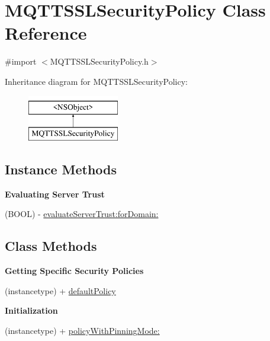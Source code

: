 \hypertarget{interface_m_q_t_t_s_s_l_security_policy}{}\section{M\+Q\+T\+T\+S\+S\+L\+Security\+Policy Class Reference}
\label{interface_m_q_t_t_s_s_l_security_policy}


{\ttfamily \#import $<$M\+Q\+T\+T\+S\+S\+L\+Security\+Policy.\+h$>$}

Inheritance diagram for M\+Q\+T\+T\+S\+S\+L\+Security\+Policy\+:\begin{figure}[H]
\begin{center}
\leavevmode
\includegraphics[height=2.000000cm]{interface_m_q_t_t_s_s_l_security_policy}
\end{center}
\end{figure}
\subsection*{Instance Methods}
\begin{Indent}\textbf{ Evaluating Server Trust}\par
{\em 

 

 }\begin{DoxyCompactItemize}
\item 
(B\+O\+OL) -\/ \hyperlink{interface_m_q_t_t_s_s_l_security_policy_a1d6690010fc530144d98eaf31c9af7e4}{evaluate\+Server\+Trust\+:for\+Domain\+:}
\end{DoxyCompactItemize}
\end{Indent}
\subsection*{Class Methods}
\begin{Indent}\textbf{ Getting Specific Security Policies}\par
{\em 

 

 }\begin{DoxyCompactItemize}
\item 
(instancetype) + \hyperlink{interface_m_q_t_t_s_s_l_security_policy_abf1594bd6fedb9222d1b4b72b972c59a}{default\+Policy}
\end{DoxyCompactItemize}
\end{Indent}
\begin{Indent}\textbf{ Initialization}\par
{\em 

 

 }\begin{DoxyCompactItemize}
\item 
(instancetype) + \hyperlink{interface_m_q_t_t_s_s_l_security_policy_a7d009f8f895d9305e5025bf37fda636d}{policy\+With\+Pinning\+Mode\+:}
\end{DoxyCompactItemize}
\end{Indent}
